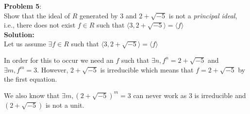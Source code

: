 \documentclass[11pt]{article}
\newcommand{\prob}[3]{\begin{flushleft}
        \textbf{Problem #1}: \\
        #2 
		\textbf{Solution:} 
		#3

\end{flushleft}}
\begin{document}
\prob{5}{
    Show that the ideal of $R$ generated by $3$ and $2 + \sqrt{-5}$ is not a \emph{principal ideal}, i.e.,
    there does not exist $f \in R$ such that $\langle 3, 2 + \sqrt{-5} \rangle = \langle f \rangle$ \\
}{ \\
    Let us assume $\exists f \in R$ such that $\langle 3, 2 + \sqrt{-5} \rangle = \langle f \rangle$

    In order for this to occur we need an $f$ such that $\exists n, f^n = 2 + \sqrt{-5}$ and $\exists m, f^m = 3$.
    However, $2 + \sqrt{-5}$ is irreducible which means that $f = 2 + \sqrt{-5}$ by the first equation.

    We also know that $\exists m, (2 + \sqrt{-5})^m = 3$ can never work as $3$ is irreducible and $(2 + \sqrt{-5})$ is not a unit.
}
\end{document}

